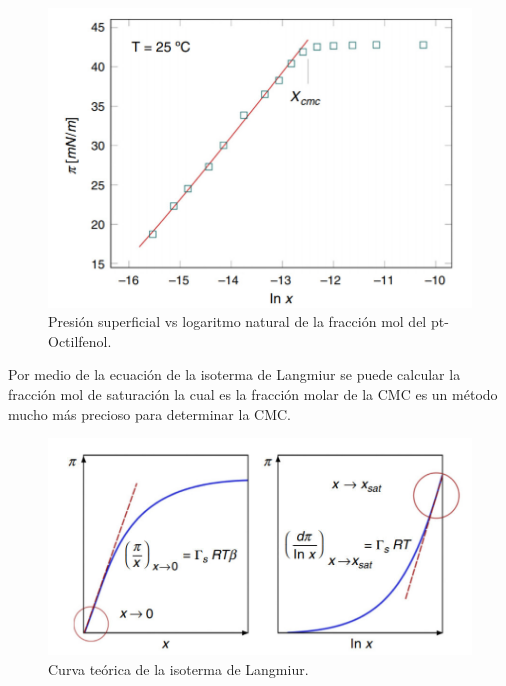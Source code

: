 \documentclass[10pt]{report}
\begin{document}
    \begin{figure}[h!]
        \centering
        \includegraphics[scale=0.5]{./iso2.jpg}
        \caption{Presión superficial vs logaritmo natural de la fracción mol del pt-Octilfenol.\cite{art:iso2}}
    \end{figure}

    Por medio de la ecuación de la isoterma de Langmiur se puede calcular la fracción mol de saturación la cual es la fracción molar de la CMC es un método mucho más precioso para determinar la CMC.

    \begin{figure}[h!]
        \centering
        \includegraphics[scale=0.75]{./isoLag.jpg}
        \caption{Curva teórica de la isoterma de Langmiur.\cite{art:iso2}}
    \end{figure}





    
    

\end{document}
